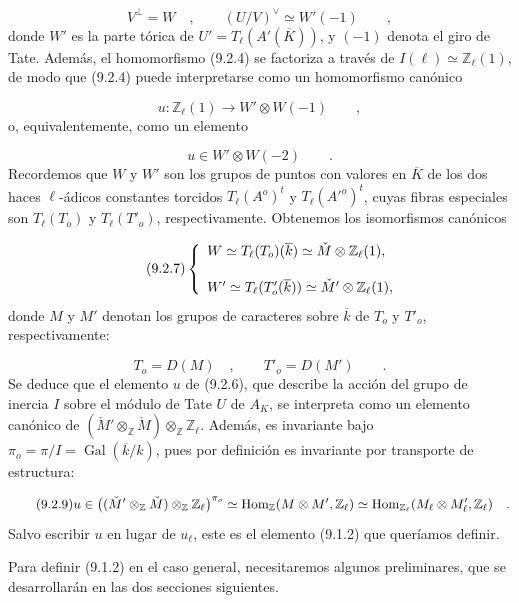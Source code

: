 \begin{equation*}
V^{\perp}=W \quad , \qquad
(U/V)^{\vee}\simeq W'(-1) \qquad ,
\end{equation*}
donde $W'$ es la parte tórica de
$U'=T_{\ell}(A'(\overline K))$, y $(-1)$ denota el giro de Tate. Además,
el homomorfismo (9.2.4) se factoriza a través de
$I(\ell)\simeq\mathbb{Z}_{\ell}(1)$, de modo que (9.2.4) puede
interpretarse como un homomorfismo canónico

\begin{equation}\tag{9.2.5}
u:\mathbb{Z}_{\ell}(1)\longrightarrow W'\otimes W(-1)
 \qquad ,
\end{equation}
o, equivalentemente, como un elemento

\begin{equation}\tag{9.2.6}
u\in W'\otimes W(-2) \qquad .
\end{equation}
Recordemos que $W$ y $W'$ son los grupos de puntos con valores en
$\overline K$ de los dos haces $\ell$-ádicos constantes torcidos
$T_{\ell}(A^o)^t$ y $T_{\ell}({A'}^o)^t$, cuyas fibras especiales son
$T_{\ell}(T_o)$ y $T_{\ell}(T'_o)$, respectivamente. Obtenemos los
isomorfismos canónicos

\begin{equation}\tag{9.2.7}
\left\{
\begin{array}{l}
W\simeq\sisi{T_{\ell}(T_o)(\overline k))}{T_{\ell}(T_o)(\overline k)}
 \simeq\check M\otimes\mathbb{Z}_{\ell}(1),\\[3ex]
W'\simeq T_{\ell}(\sisi{T_o}{T'_o}(\overline k))
 \simeq\check M'\otimes\mathbb{Z}_{\ell}(1),
\end{array}
\right.
\end{equation}
donde $M$ y $M'$ denotan los grupos de caracteres sobre $\overline k$
de $T_o$ y $T'_o$, respectivamente:

\begin{equation}\tag{9.2.8}
T_o=D(M) \quad , \qquad T'_o=D(M') \qquad .
\end{equation}
Se deduce que el elemento $u$ de (9.2.6), que describe la acción del
grupo de inercia $I$ sobre el módulo de Tate $U$ de $A_K$, se interpreta
como un elemento canónico de
$(\check M'\otimes_{\mathbb{Z}}\check M)
 \otimes_{\mathbb{Z}}\mathbb{Z}_{\ell}$. Además, es invariante bajo
$\pi_o=\pi/I=\operatorname{Gal}(\overline k/k)$, pues por definición es
invariante por transporte de estructura:


\begin{equation}\tag{9.2.9}
u\in
\bigl((\check M'\otimes_{\mathbb{Z}}\check M)
 \otimes_{\mathbb{Z}}\mathbb{Z}_{\ell}\bigr)^{\sisi{I}{\pi_o}}
\simeq
\operatorname{Hom}_{\mathbb{Z}}
 (\underline M\otimes\underline M',\mathbb{Z}_{\ell})
\simeq
\operatorname{Hom}_{\mathbb{Z}_{\ell}}
 (\underline M_{\ell}\otimes\underline M'_{\ell},
  \mathbb{Z}_{\ell}) \quad .
\end{equation}
Salvo escribir $u$ en lugar de $u_{\ell}$, este es el elemento (9.1.2)
que queríamos definir.

Para definir (9.1.2) en el caso general, necesitaremos algunos
preliminares, que se desarrollarán en las dos secciones siguientes.
